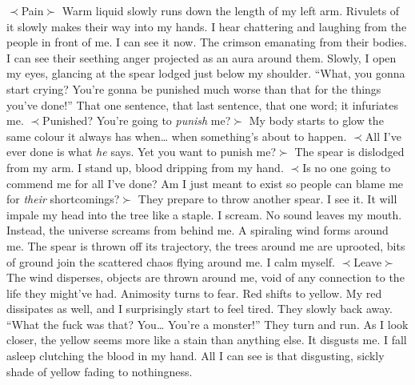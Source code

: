 \documentclass[openany, 12pt]{book}
\newcommand\tab[1][1cm]{\hspace*{#1}}
\begin{document}
\newline
$\prec$Pain$\succ$\newline
\tab
Warm liquid slowly runs down the length of my left arm. Rivulets of it slowly makes their way into my hands. I hear chattering and laughing from the people in front of me. I can see it now. The crimson emanating from their bodies. I can see their seething anger projected as an aura around them. Slowly, I open my eyes, glancing at the spear lodged just below my shoulder.\newline
\tab
``What, you gonna start crying? You’re gonna be punished much worse than that for the things you’ve done!''\newline
\tab
That one sentence, that last sentence, that one word; it infuriates me.\newline
$\prec$Punished? You’re going to \textit{punish} me?$\succ$\newline
\tab
My body starts to glow the same colour it always has when… when something’s about to happen. \newline
$\prec$All I’ve ever done is what \textit{he} says. Yet you want to punish me?$\succ$\newline
\tab
The spear is dislodged from my arm. I stand up, blood dripping from my hand.\newline
$\prec$Is no one going to commend me for all I’ve done? Am I just meant to exist so people can blame me for \textit{their} shortcomings?$\succ$\newline
\tab
They prepare to throw another spear. I see it. It will impale my head into the tree like a staple. I scream. No sound leaves my mouth. Instead, the universe screams from behind me. A spiraling wind forms around me. The spear is thrown off its trajectory, the trees around me are uprooted, bits of ground join the scattered chaos flying around me. I calm myself.\newline
$\prec$Leave$\succ$\newline
\tab
The wind disperses, objects are thrown around me, void of any connection to the life they might’ve had. Animosity turns to fear. Red shifts to yellow. My red dissipates as well, and I surprisingly start to feel tired. They slowly back away.\newline
\tab
``What the fuck was that? You… You’re a monster!''\newline
\tab
They turn and run. As I look closer, the yellow seems more like a stain than anything else. It disgusts me. I fall asleep clutching the blood in my hand. All I can see is that disgusting, sickly shade of yellow fading to nothingness.\newline\newline
\end{document}
